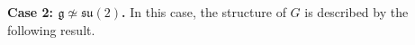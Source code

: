 \documentclass[reqno]{amsart}
\newtheorem{theorem}{Theorem}[section]
\newtheorem{lemma}[theorem]{Lemma}
\theoremstyle{remark}
\theoremstyle{plain}
\begin{document}
\smallskip
\noindent

\textbf{Case 2: \(\mathfrak g \not\simeq \mathfrak{su}(2)\).}  
In this case, the structure of \(G\) is described by the following result.
\end{document}
